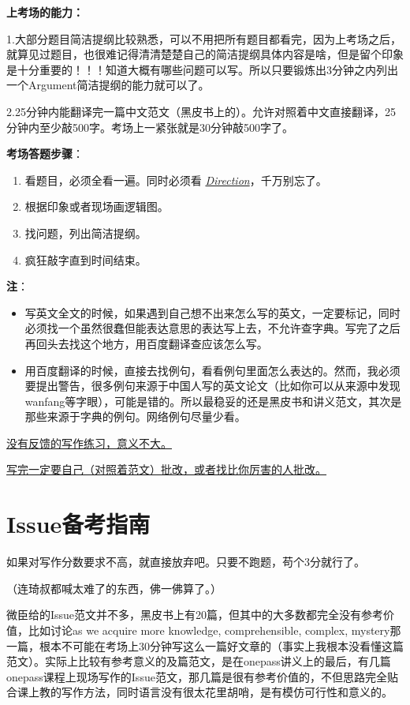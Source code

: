 \documentclass[cn,plain]{./src/qyxfbook}
\newcommand{\red}[1]{\textcolor[rgb]{1,0,0}{#1}}
\begin{document}
			\textbf{上考场的能力：}\par
			1.大部分题目简洁提纲比较熟悉，可以不用把所有题目都看完，因为上考场之后，就算见过题目，也很难记得清清楚楚自己的简洁提纲具体内容是啥，\red{但是留个印象是十分重要的！！！知道大概有哪些问题可以写。}所以只要锻炼出3分钟之内列出一个Argument简洁提纲的能力就可以了。\par
			2.25分钟内能翻译完一篇中文范文（黑皮书上的）。允许对照着中文直接翻译，25分钟内至少敲500字。考场上一紧张就是30分钟敲500字了。

			\textbf{考场答题步骤}：\par
		\begin{enumerate}
		\item 看题目，必须全看一遍。同时必须看 \red{\Large\itshape\underline{Direction}}，千万别忘了。

		\item 根据印象或者现场画逻辑图。

		\item 找问题，列出简洁提纲。

		\item 疯狂敲字直到时间结束。\par
		\end{enumerate}
			\textbf{注}：
			\begin{itemize}
				\item 写英文全文的时候，如果遇到自己想不出来怎么写的英文，一定要标记，同时必须找一个虽然很蠢但能表达意思的表达写上去，不允许查字典。写完了之后再回头去找这个地方，用百度翻译查应该怎么写。
				\item 用百度翻译的时候，直接去找例句，看看例句里面怎么表达的。然而，我必须要提出警告，很多例句来源于中国人写的英文论文（比如你可以从来源中发现wanfang等字眼），可能是错的。所以最稳妥的还是黑皮书和讲义范文，其次是那些来源于字典的例句。网络例句尽量少看。
			\end{itemize}

			\underline{没有反馈的写作练习，意义不大。}
			
			\underline{写完一定要自己（对照着范文）批改，或者找比你厉害的人批改。}
		
	
		\section{Issue备考指南}
			如果对写作分数要求不高，就直接放弃吧。只要不跑题，苟个3分就行了。\par
			（连琦叔都喊太难了的东西，佛一佛算了。）

			
			微臣给的Issue范文并不多，黑皮书上有20篇，但其中的大多数都完全没有参考价值，比如讨论as we acquire more knowledge, comprehensible, complex, mystery那一篇，根本不可能在考场上30分钟写这么一篇好文章的（事实上我根本没看懂这篇范文）。实际上比较有参考意义的及篇范文，是在onepass讲义上的最后，有几篇onepass课程上现场写作的Issue范文，那几篇是很有参考价值的，不但思路完全贴合课上教的写作方法，同时语言没有很太花里胡哨，是有模仿可行性和意义的。
\end{document}
